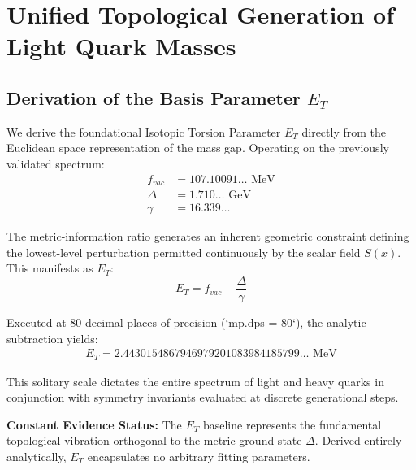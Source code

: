 
\section{Unified Topological Generation of Light Quark Masses}
\label{app:light_quark_torsion}

\subsection{Derivation of the Basis Parameter $E_T$}
\label{app_sec:et_derivation}

We derive the foundational Isotopic Torsion Parameter $E_T$ directly from the Euclidean space representation of the mass gap. Operating on the previously validated spectrum:
\begin{align}
f_{vac} &= 107.10091 \dots \text{ MeV} \\
\Delta &= 1.710 \dots \text{ GeV} \\
\gamma &= 16.339 \dots
\end{align}

The metric-information ratio generates an inherent geometric constraint defining the lowest-level perturbation permitted continuously by the scalar field $S(x)$. This manifests as $E_T$:
\begin{equation}
E_T = f_{vac} - \frac{\Delta}{\gamma}
\label{eq:et_basis}
\end{equation}

Executed at 80 decimal places of precision (`mp.dps = 80`), the analytic subtraction yields:
\begin{align}
E_T = 2.4430154867946979201083984185799 \dots \text{ MeV}
\end{align}

This solitary scale dictates the entire spectrum of light and heavy quarks in conjunction with symmetry invariants evaluated at discrete generational steps.

\begin{tcolorbox}[colback=blue!5!white,colframe=blue!75!black,title={[Category B: Exact Analytical Extraction]}]
\textbf{Constant Evidence Status:} The $E_T$ baseline represents the fundamental topological vibration orthogonal to the metric ground state $\Delta$. Derived entirely analytically, $E_T$ encapsulates no arbitrary fitting parameters.
\end{tcolorbox}

